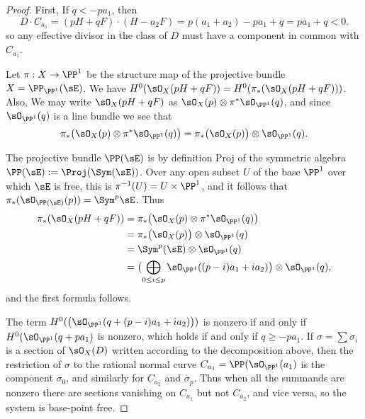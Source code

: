 \begin{proof} First, If $q<-pa_{1}$, then 
$$
D\cdot C_{a_{1}} = (pH+qF) \cdot (H-a_{2}F) = p(a_{1}+a_{2}) -pa_{1}+q = pa_{1}+q < 0.
$$
so any effective divisor in the class of $D$ must have a component in common with $C_{a_{1}}$.

Let $\pi:X\to \PP^{1}$ be the structure map of the projective bundle $X = \PP_{\PP^{1}}(\sE)$.
We have $H^{0}(\sO_{X}(pH+qF)) = H^{0}(\pi_{*}(\sO_{X}(pH+qF)))$. Also, 
We may write $\sO_{X}(pH+qF)$ as $\sO_{X}(p) \otimes \pi^{*}\sO_{\PP^{1}}(q)$, and since
$\sO_{\PP^{1}}(q)$ is a line bundle we see that 
$$
\pi_{*}\bigl(\sO_{X}(p) \otimes \pi^{*}\sO_{\PP^{1}}(q)\bigr) 
 = \pi_{*}\bigl(\sO_{X}(p)\bigr)\otimes \sO_{\PP^{1}}(q).
$$

The projective bundle $\PP(\sE)$ is
by definition Proj of the symmetric algebra $\PP(\sE):=\Proj(\Sym(\sE))$. Over any open 
subset $U$ of the base $\PP^1$ over which $\sE$ is free, this is $\pi^{-1}(U) = U\times \PP^1$,
and it follows that $\pi_*(\sO_{\PP(\sE)}(p)) = \Sym^p\sE$. 
Thus 
\begin{align*}
\pi_{*}(\sO_{X}(pH+qF)) &= 
\pi_{*}\bigl(\sO_{X}(p) \otimes \pi^{*}\sO_{\PP^{1}}(q)\bigr) \\
 &= \pi_{*}\bigl(\sO_{X}(p)\bigr)\otimes \sO_{\PP^{1}}(q)\\
&=  \Sym^{p}(\sE)\otimes \sO_{\PP^{1}}(q)\\
&=  \bigl(\bigoplus_{0\leq i\leq p} \sO_{\PP^{1}}((p-i)a_{1}+i a_{2})\bigr) \otimes \sO_{\PP^{1}}(q),
\end{align*}
and the first formula follows. 

The term 
$H^{0}(\bigl(\sO_{\PP^{1}}(q + (p-i)a_{1}+i a_{2})\bigr))$ is nonzero if and only if 
$H^{0}(\sO_{\PP^{1}}(q + pa_{1})$ is nonzero, which holds if and only if $q\geq -pa_{1}$.
If $\sigma = \sum \sigma_i$ is a section of $\sO_X(D)$ written according to the decomposition
above, then the restriction of $\sigma$ to  the rational normal curve $C_{a_1} = \PP(\sO_{\PP^1}(a_1)$ is the component $\sigma_0$, and similarly for $C_{a_2}$ and $\sigma_p$. Thus when  all the summands are nonzero
there are sections  vanishing on $C_{a_{1}}$ but not $C_{a_{2}}$, and vice versa, so the system is base-point free. 
\end{proof}




